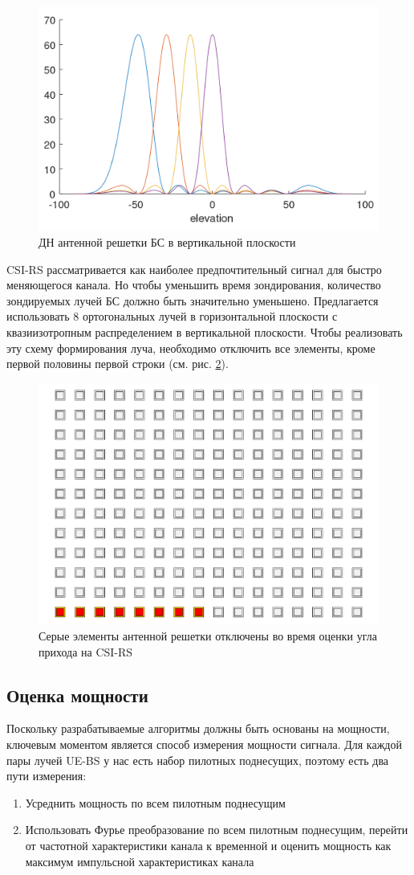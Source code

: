 \begin{figure}[ht]
    \centering
    \includegraphics[width=0.5\linewidth]{figs/fig4.6}
    \caption{ДН антенной решетки БС в вертикальной плоскости}
    \label{fig:4.7}
\end{figure}


CSI-RS рассматривается как наиболее предпочтительный сигнал для быстро меняющегося канала. 
Но чтобы уменьшить время зондирования, количество
зондируемых лучей БС должно быть значительно уменьшено. Предлагается
использовать 8 ортогональных лучей в горизонтальной плоскости с квазиизотропным распределением 
в вертикальной плоскости.
Чтобы реализовать эту схему формирования луча, необходимо отключить все
элементы, кроме первой половины первой строки (см. рис. \ref{fig:4.8}).

\begin{figure}[ht]
    \centering
    \includegraphics[width=0.35\linewidth]{figs/fig4.8.pdf}
    \caption{Серые элементы антенной решетки отключены во время оценки угла прихода на CSI-RS}
    \label{fig:4.8}
\end{figure}
\subsection{Оценка мощности}

Поскольку разрабатываемые алгоритмы должны быть основаны на мощности, ключевым
моментом является способ измерения мощности сигнала. Для каждой пары лучей UE-BS
у нас есть набор пилотных поднесущих, поэтому есть два пути измерения:
\begin{enumerate}
    \item Усреднить мощность по всем пилотным поднесущим
    \item Использовать Фурье преобразование по всем пилотным поднесущим, перейти от частотной характеристики канала к временной и оценить мощность как максимум импульсной характеристиках канала
\end{enumerate}

